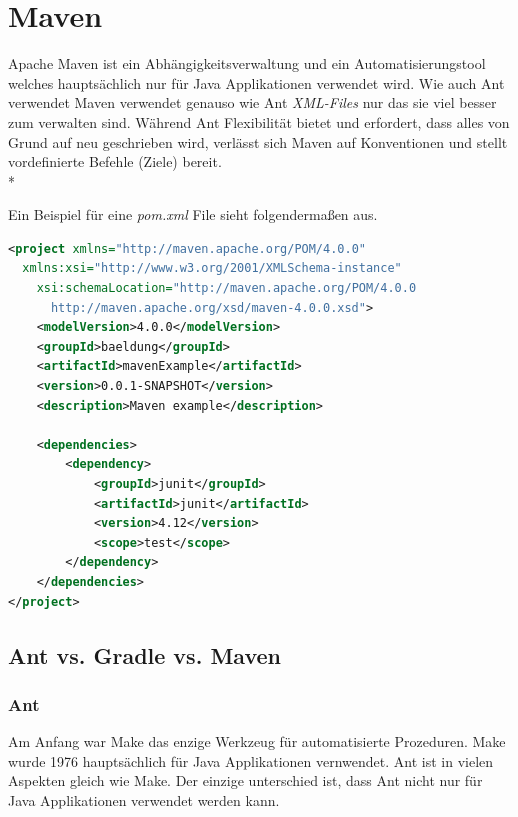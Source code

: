 \pagebreak

\section{Maven}
\author{David Ignjatovic}

Apache Maven ist ein Abhängigkeitsverwaltung und ein Automatisierungstool welches hauptsächlich nur für Java Applikationen verwendet wird. Wie auch Ant verwendet
Maven verwendet genauso wie Ant \textit{XML-Files} nur das sie viel besser zum verwalten sind. Während Ant Flexibilität bietet und erfordert, 
dass alles von Grund auf neu geschrieben wird, verlässt sich Maven auf Konventionen und stellt vordefinierte Befehle (Ziele) bereit. \\* \cite{MavenVsAntVsGradle}

Ein Beispiel für eine \textit{pom.xml} File sieht folgendermaßen aus.

 
\begin{lstlisting}[language=xml,caption=maven file,label=lst:impl:foo]
<project xmlns="http://maven.apache.org/POM/4.0.0" 
  xmlns:xsi="http://www.w3.org/2001/XMLSchema-instance"
    xsi:schemaLocation="http://maven.apache.org/POM/4.0.0 
      http://maven.apache.org/xsd/maven-4.0.0.xsd">
    <modelVersion>4.0.0</modelVersion>
    <groupId>baeldung</groupId>
    <artifactId>mavenExample</artifactId>
    <version>0.0.1-SNAPSHOT</version>
    <description>Maven example</description>

    <dependencies>
        <dependency>
            <groupId>junit</groupId>
            <artifactId>junit</artifactId>
            <version>4.12</version>
            <scope>test</scope>
        </dependency>
    </dependencies>
</project>
\end{lstlisting}

\subsection{Ant vs. Gradle vs. Maven}

\subsubsection{Ant}

Am Anfang war Make das enzige Werkzeug für automatisierte Prozeduren. Make wurde 1976 hauptsächlich für Java Applikationen vernwendet.
Ant ist in vielen Aspekten gleich wie Make. Der einzige unterschied ist, dass Ant nicht nur für Java Applikationen verwendet werden kann.

